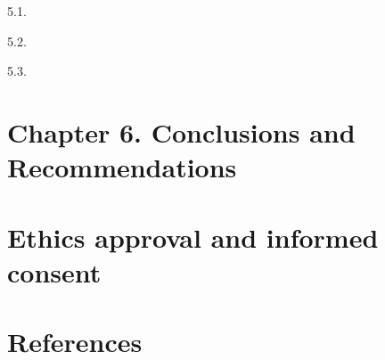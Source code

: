 \documentclass[
  letterpaper,
  DIV=11,
  numbers=noendperiod]{scrartcl}
\begin{document}
5.1.

5.2.

5.3.

\hypertarget{chapter-6.-conclusions-and-recommendations}{%
\section{Chapter 6. Conclusions and
Recommendations}\label{chapter-6.-conclusions-and-recommendations}}

\hypertarget{ethics-approval-and-informed-consent}{%
\section{Ethics approval and informed
consent}\label{ethics-approval-and-informed-consent}}

\hypertarget{references}{%
\section*{References}\label{references}}
\end{document}

